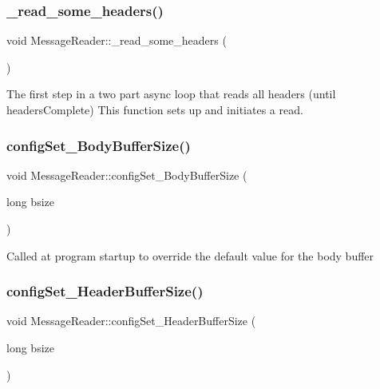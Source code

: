 \subsubsection{\texorpdfstring{\+\_\+read\+\_\+some\+\_\+headers()}{\_read\_some\_headers()}}
{\footnotesize\ttfamily void Message\+Reader\+::\+\_\+read\+\_\+some\+\_\+headers (\begin{DoxyParamCaption}{ }\end{DoxyParamCaption})\hspace{0.3cm}{\ttfamily [protected]}}

The first step in a two part async loop that reads all headers (until headers\+Complete) This function sets up and initiates a read. \mbox{\label{class_message_reader_a83e245590821f3c60de01f698febac25}} 
\subsubsection{\texorpdfstring{config\+Set\+\_\+\+Body\+Buffer\+Size()}{configSet\_BodyBufferSize()}}
{\footnotesize\ttfamily void Message\+Reader\+::config\+Set\+\_\+\+Body\+Buffer\+Size (\begin{DoxyParamCaption}\item[{long}]{bsize }\end{DoxyParamCaption})\hspace{0.3cm}{\ttfamily [static]}}

Called at program startup to override the default value for the body buffer \mbox{\label{class_message_reader_ab80bdac9cbb3d446a6d8b5e944ba3bfe}} 
\subsubsection{\texorpdfstring{config\+Set\+\_\+\+Header\+Buffer\+Size()}{configSet\_HeaderBufferSize()}}
{\footnotesize\ttfamily void Message\+Reader\+::config\+Set\+\_\+\+Header\+Buffer\+Size (\begin{DoxyParamCaption}\item[{long}]{bsize }\end{DoxyParamCaption})\hspace{0.3cm}{\ttfamily [static]}}

